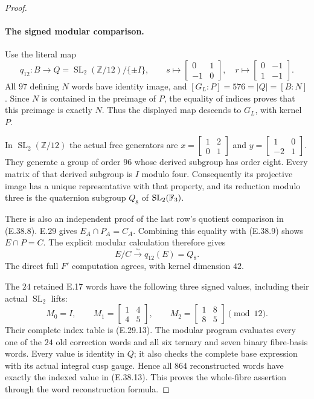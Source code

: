 \begin{proof}
\paragraph{The signed modular comparison.}
Use the literal map
\[
 q_{12}:B\longrightarrow Q=
       \operatorname{SL}_2(\mathbb Z/12)/\{\pm I\},
 \qquad
 s\longmapsto\begin{bmatrix}0&1\\-1&0\end{bmatrix},
 \quad r\longmapsto\begin{bmatrix}0&-1\\1&-1\end{bmatrix}.
 \tag{E.38.11}
\]
All $97$ defining $N$ words have identity image,
and $[G_L:P]=576=|Q|=[B:N]$.
Since $N$ is contained in the preimage of $P$,
the equality of indices proves that this
preimage is exactly $N$.  Thus the displayed
map descends to $G_L$, with kernel $P$.

In $\operatorname{SL}_2(\mathbb Z/12)$ the actual
free generators are
$x=\left[\begin{smallmatrix}1&2\\0&1\end{smallmatrix}\right]$
and
$y=\left[\begin{smallmatrix}1&0\\-2&1\end{smallmatrix}\right]$.
They generate a group of order $96$ whose
derived subgroup has order eight.  Every
matrix of that derived subgroup is $I$
modulo four.  Consequently its projective
image has a unique representative with that
property, and its reduction modulo three
is the quaternion subgroup $Q_8$ of
$\operatorname{SL}_2(\mathbb F_3)$.

There is also an independent proof of the
last row's quotient comparison in
\textup{(E.38.8)}.  E.29 gives
$E_A\cap P_A=C_A$.  Combining this equality
with \textup{(E.38.9)} shows $E\cap P=C$.
The explicit modular calculation therefore gives
\[
                 E/C\xrightarrow{\sim}q_{12}(E)=Q_8.
 \tag{E.38.12}
\]
The direct full $F'$ computation agrees, with
kernel dimension $42$.

The $24$ retained E.17 words have the following
three signed values, including their actual
$\operatorname{SL}_2$ lifts:
\[
 M_0=I,\qquad
 M_1=\begin{bmatrix}1&4\\4&5\end{bmatrix},\qquad
 M_2=\begin{bmatrix}1&8\\8&5\end{bmatrix}
                      \pmod{12}.
 \tag{E.38.13}
\]
Their complete index table is (E.29.13).
The modular program evaluates every one of
the $24$ old correction words and all six
ternary and seven binary fibre-basis words.
Every value is identity in $Q$; it also
checks the complete base expression with
its actual integral cusp gauge.  Hence
all $864$ reconstructed words have exactly
the indexed value in \textup{(E.38.13)}.
This proves the whole-fibre assertion
through the word reconstruction formula.


\end{proof}
